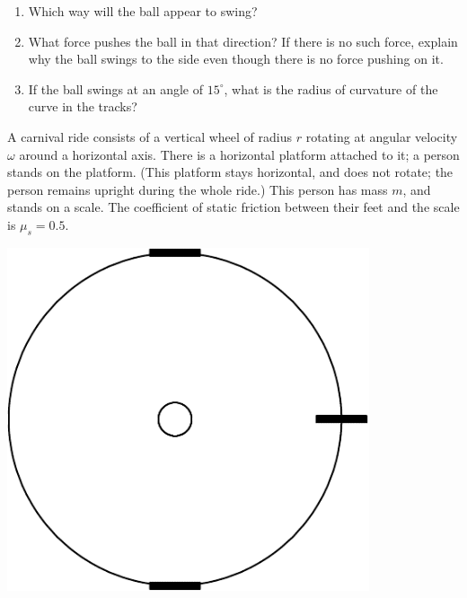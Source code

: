 \documentclass[12pt]{article}
\begin{document}
\begin{enumerate}
\begin{enumerate}
\item Which way will the ball appear to swing?
\item What force pushes the ball in that direction? If there is no such force, explain why the ball swings to the side even though there is no force pushing on it.
\item If the ball swings at an angle of $15^\circ$, what is the radius of curvature of the curve in the tracks?
\end{enumerate}

\begin{minipage}[t]{0.6\textwidth}
\item 

A carnival ride consists of a vertical wheel of radius $r$ rotating at angular velocity $\omega$ around a
horizontal axis. There is a horizontal platform attached to it; a person stands on the platform. (This platform
stays horizontal, and does not rotate; the person remains upright during the whole ride.) This
person has mass $m$, and stands on a scale. The coefficient of static friction between their feet and the scale is 
$\mu_s = 0.5$.
\end{minipage}
\begin{minipage}{0.35\textwidth}
\vspace{0.8in}
\begin{center}
\includegraphics[width=0.8\textwidth]{wheel-crop.pdf}
\end{center}
\end{minipage}


\end{enumerate}
\end{document}
